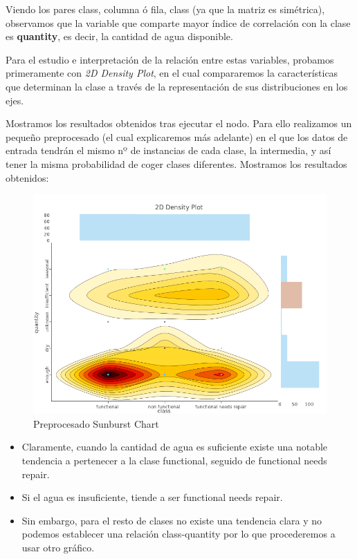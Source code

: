 	Viendo los pares {class, columna} ó {fila, class} (ya que la matriz es simétrica), observamos que la variable que comparte mayor índice de correlación con la clase es \textbf{quantity}, es decir, la cantidad de agua disponible.
	
	
	
	
	
	
	Para el estudio e interpretación de la relación entre estas variables, probamos primeramente con \textit{2D Density Plot}, en el cual compararemos la características que determinan la clase a través de la representación de sus distribuciones en los ejes.
	
	Mostramos los resultados obtenidos tras ejecutar el nodo. Para ello realizamos un pequeño preprocesado (el cual explicaremos más adelante) en el que los datos de entrada tendrán el mismo nº de instancias de cada clase, la intermedia, y así tener la misma probabilidad de coger clases diferentes. Mostramos los resultados obtenidos:
	
	\begin{figure}[H]
		\centering
		\includegraphics[width=1\textwidth]{img/density.png}
		\caption{Preprocesado Sunburst Chart}
	\end{figure}
	
	\begin{itemize}
	
	\item Claramente, cuando la cantidad de agua es suficiente existe una notable tendencia a pertenecer a la clase functional, seguido de functional needs repair.
	\item Si el agua es insuficiente, tiende a ser functional needs repair.
	\item Sin embargo, para el resto de clases no existe una tendencia clara y no podemos establecer una relación class-quantity por lo que procederemos a usar otro gráfico.
	\end{itemize}
	
